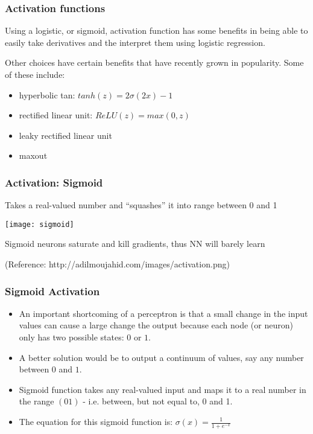 \begin{frame}[fragile] \frametitle{Activation functions}

Using a logistic, or sigmoid, activation function has
some benefits in being able to easily take derivatives and the interpret
them using logistic regression.

Other choices have certain benefits that have recently grown in popularity.
Some of these include:
\begin{itemize}
\item hyperbolic tan: $tanh(z) = 2 \sigma(2x) - 1$
\item rectified linear unit: $ReLU(z) = max(0, z)$
\item leaky rectified linear unit
\item maxout
\end{itemize}

\end{frame}


\begin{frame}[fragile] \frametitle{Activation: Sigmoid}
Takes a real-valued number and ``squashes'' it into range between 0 and 1

\begin{center}
\texttt{[image: sigmoid]}
\end{center}
Sigmoid neurons saturate and kill gradients, thus NN will barely learn


\tiny{(Reference: http://adilmoujahid.com/images/activation.png)}
\end{frame}


\begin{frame}[fragile] \frametitle{Sigmoid Activation}

\begin{itemize}
\item An important shortcoming of a perceptron is that a small change in
the input values can cause a large change the output because each
node (or neuron) only has two possible states: $0$ or $1$. 
\item A better
solution would be to output a continuum of values, say any number
between $0$ and $1$.
\item Sigmoid function takes any real-valued input and maps it to a real number in the range $(0 1)$ - i.e. between, but not equal to, 0 and 1.
\item The equation for this sigmoid function is:
$\sigma ( x ) = \frac{1}{1 + e^{-x}}$
\end{itemize}
\end{frame}


